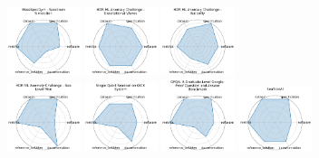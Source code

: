 \begin{figure}[ht!]
\includegraphics[width=0.1900\textwidth]{images/massspecgym_-_spectrum_simulation_radar.pdf}
\includegraphics[width=0.1900\textwidth]{images/hdr_ml_anomaly_challenge_-_gravitational_waves_radar.pdf}
\includegraphics[width=0.1900\textwidth]{images/hdr_ml_anomaly_challenge_-_butterfly_radar.pdf}
\\[1ex]
\includegraphics[width=0.1900\textwidth]{images/hdr_ml_anomaly_challenge_-_sea_level_rise_radar.pdf}
\includegraphics[width=0.1900\textwidth]{images/single_qubit_readout_on_qick_system_radar.pdf}
\includegraphics[width=0.1900\textwidth]{images/gpqa_a_graduate-level_google-proof_question_and_answer_benchmark_radar.pdf}
\includegraphics[width=0.1900\textwidth]{images/seafloorai_radar.pdf}

\end{figure}

